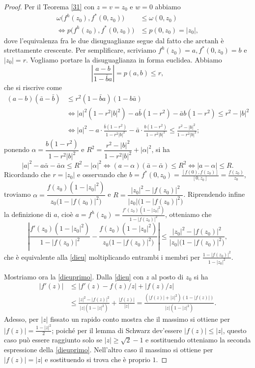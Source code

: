 \begin{proof}
  Per il Teorema \ref{31} con $z=v=z_0$ e $w=0$ abbiamo
  \begin{align*}
    \omega\bigl(f^h(z_0),f^*(0,z_0)\bigr) & \le \omega(0,z_0) \\
    \iff p\bigl(f^h(z_0),f^*(0,z_0)\bigr) & \le p(0,z_0)=|z_0|,
  \end{align*}
  dove l'equivalenza fra le due disuguaglianze segue dal fatto che $\text{arctanh}$ è strettamente crescente. Per semplificare, scriviamo $f^h(z_0)=a, f^*(0,z_0)=b$ e $|z_0|=r$. Vogliamo portare la disuguaglianza in forma euclidea. Abbiamo
  $$\left|\frac{a-b}{1-\bar{b}a}\right|=p(a,b) \le r,$$
  che si riscrive come
  \begin{align*}
    (a-b)(\bar{a}-\bar{b}) & \le r^2(1-\bar{b}a)(1-b\bar{a}) \\
    & \iff |a|^2(1-r^2|b|^2)-a\bar{b}(1-r^2)-\bar{a}b(1-r^2) \le r^2-|b|^2 \\
    & \iff |a|^2-a\cdot\frac{\bar{b}(1-r^2)}{1-r^2|b|^2}-\bar{a}\cdot\frac{b(1-r^2)}{1-r^2|b|^2} \le \frac{r^2-|b|^2}{1-r^2|b|^2};
  \end{align*}
  ponendo $\alpha=\dfrac{b(1-r^2)}{1-r^2|b|^2}$ e $R^2=\dfrac{r^2-|b|^2}{1-r^2|b|^2}+|\alpha|^2$, si ha
  $$|a|^2-a\bar{\alpha}-\bar{a}\alpha \le R^2-|\alpha|^2 \iff (a-\alpha)(\bar{a}-\bar{\alpha}) \le R^2\iff |a-\alpha| \le R.$$
  Ricordando che $r=|z_0|$ e osservando che $b=f^*(0,z_0)=\frac{[f(0),f(z_0)]}{[0,z_0]}=\frac{f(z_0)}{z_0}$, troviamo $\alpha=\dfrac{f(z_0)(1-|z_0|^2)}{z_0\bigl(1-|f(z_0)|^2\bigr)}$ e $R=\dfrac{|z_0|^2-|f(z_0)|^2}{|z_0|\bigl(1-|f(z_0)|^2\bigr)}$.
  Riprendendo infine la definizione di $a$, cioè $a=f^h(z_0)=\frac{f'(z_0)(1-|z_0|^2)}{1-|f(z_0)|^2}$, otteniamo che
  $$\left|\frac{f'(z_0)(1-|z_0|^2)}{1-|f(z_0)|^2}-\frac{f(z_0)(1-|z_0|^2)}{z_0\bigl(1-|f(z_0)|^2\bigr)}\right| \le \frac{|z_0|^2-|f(z_0)|^2}{|z_0|\bigl(1-|f(z_0)|^2\bigr)},$$
  che è equivalente alla \eqref{dieu} moltiplicando entrambi i membri per $\frac{1-|f(z_0)|^2}{1-|z_0|^2}$.

  Mostriamo ora la \eqref{dieuprimo}. Dalla \eqref{dieu} con $z$ al posto di $z_0$ si ha
  \begin{align*}
    |f'(z)| & \le |f'(z)-f(z)/z|+|f(z)/z| \\
    & \le \frac{|z|^2-|f(z)|^2}{|z|(1-|z|^2)}+\frac{|f(z)|}{|z|}=\frac{(|f(z)|+|z|^2)(1-|f(z)|)}{|z|(1-|z|^2)}.
  \end{align*}
  Adesso, per $|z|$ fissato un rapido conto mostra che il massimo si ottiene per $|f(z)|=\frac{1-|z|^2}{2}$; poiché per il lemma di Schwarz dev'essere $|f(z)| \le |z|$, questo caso può essere raggiunto solo se $|z| \ge \sqrt{2}-1$ e sostituendo otteniamo la seconda espressione della \eqref{dieuprimo}. Nell'altro caso il massimo si ottiene per $|f(z)|=|z|$ e sostituendo si trova che è proprio $1$.
\end{proof}
